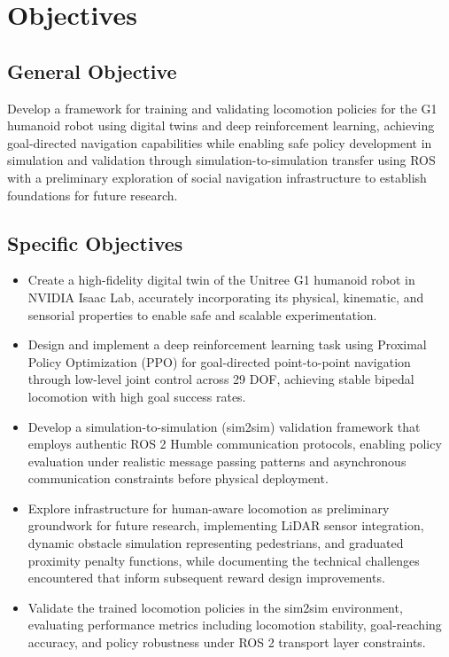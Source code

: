 \documentclass[12pt,a4paper]{article}
\begin{document}
\section{Objectives}

\subsection{General Objective}

Develop a framework for training and validating locomotion policies for the G1 humanoid robot using digital twins and deep reinforcement learning, achieving goal-directed navigation capabilities while enabling safe policy development in simulation and validation through simulation-to-simulation transfer using ROS with a preliminary exploration of social navigation infrastructure to establish foundations for future research.

\subsection{Specific Objectives}
\begin{itemize}
    \item Create a high-fidelity digital twin of the Unitree G1 humanoid robot in NVIDIA Isaac Lab, accurately incorporating its physical, kinematic, and sensorial properties to enable safe and scalable experimentation.

    \item Design and implement a deep reinforcement learning task using Proximal Policy Optimization (PPO) for goal-directed point-to-point navigation through low-level joint control across 29 DOF, achieving stable bipedal locomotion with high goal success rates.

    \item Develop a simulation-to-simulation (sim2sim) validation framework that employs authentic ROS 2 Humble communication protocols, enabling policy evaluation under realistic message passing patterns and asynchronous communication constraints before physical deployment.

    \item Explore infrastructure for human-aware locomotion as preliminary groundwork for future research, implementing LiDAR sensor integration, dynamic obstacle simulation representing pedestrians, and graduated proximity penalty functions, while documenting the technical challenges encountered that inform subsequent reward design improvements.

    \item Validate the trained locomotion policies in the sim2sim environment, evaluating performance metrics including locomotion stability, goal-reaching accuracy, and policy robustness under ROS 2 transport layer constraints.
\end{itemize}
\end{document}
